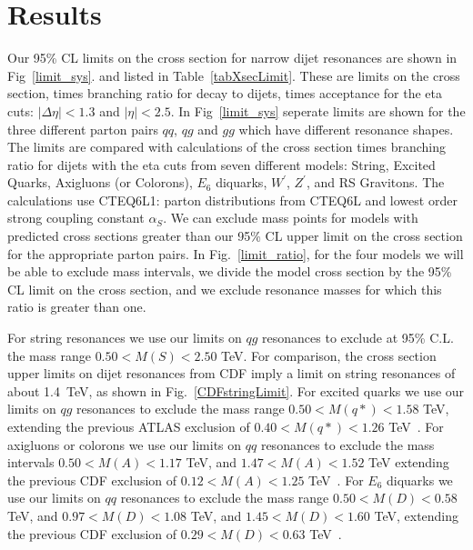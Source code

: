\section{Results}

Our 95\% CL limits on the cross section for narrow dijet resonances are shown 
in Fig~\ref{limit_sys}.
and listed in Table~\ref{tabXsecLimit}.  
These are limits on the cross section, times 
branching ratio for decay to dijets, times acceptance for the 
eta cuts: $|\Delta\eta|<1.3$ and $|\eta|<2.5$.  In Fig~\ref{limit_sys} seperate limits are shown for the three different
parton pairs $qq$, $qg$ and $gg$ which have different resonance shapes.
The limits are compared with calculations of the cross section times 
branching ratio for dijets with the eta cuts from seven different
models: String, Excited Quarks, Axigluons (or Colorons), $E_6$ diquarks,
$W^{\prime}$, $Z ^{\prime}$, and RS Gravitons.
The calculations use CTEQ6L1: parton distributions from CTEQ6L and lowest order strong 
coupling constant $\alpha_S$.
We can exclude mass points for models with predicted cross sections greater 
than our 95\% CL upper limit on the cross section for the appropriate parton
pairs. In Fig.~\ref{limit_ratio}, for the four models we will be able to exclude mass intervals, 
we divide the model cross section by the 95\% CL limit on the cross section, and we 
exclude resonance masses for which this ratio is greater than one.

 For string resonances we use our limits on $qg$ resonances to exclude at 95\% C.L. the mass
range $0.50 < M(S) < 2.50$ TeV.
For comparison, the cross section upper limits on dijet resonances from CDF imply a limit on string resonances of about 1.4~TeV, 
as shown in Fig.~\ref{CDFstringLimit}.
For excited quarks we use our limits on $qg$ resonances to exclude the mass range $0.50<M(q*)<1.58$ TeV,
extending the previous ATLAS exclusion of $0.40<M(q*)<1.26$ TeV~\cite{ATLAS_Search}.
For axigluons or colorons 
we use our limits on $qq$ resonances to exclude the mass intervals 
$0.50<M(A)<1.17$ TeV, and $1.47<M(A)<1.52$ TeV extending the
previous CDF exclusion of $0.12<M(A)<1.25$ TeV~\cite{Aaltonen:2008dn}. 
For $E_6$ diquarks we use our limits on $qq$ resonances to exclude the mass range 
$0.50<M(D)<0.58$ TeV, and $0.97 < M(D) < 1.08$ TeV, and $1.45 < M(D) < 1.60$ TeV, 
extending the previous CDF exclusion of $0.29<M(D)<0.63$ TeV~\cite{Aaltonen:2008dn}.

